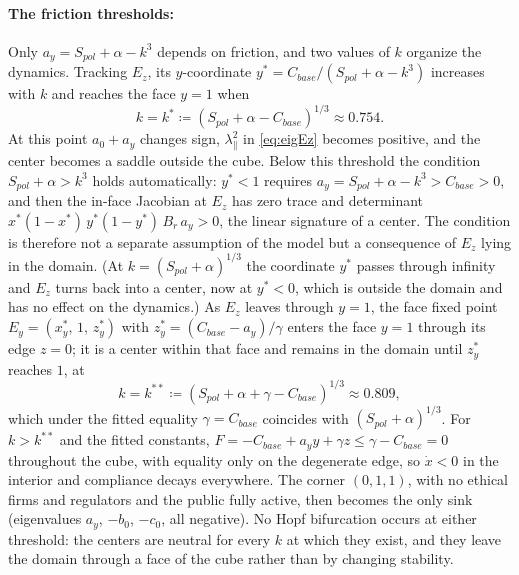 \documentclass[10pt]{article}
\begin{document}
\paragraph{The friction thresholds:} Only $a_y=S_{pol}+\alpha-k^3$ depends on friction, and two values of $k$ organize the dynamics. Tracking $E_z$, its $y$-coordinate $y^*=C_{base}/(S_{pol}+\alpha-k^3)$ increases with $k$ and reaches the face $y=1$ when
\begin{equation}
k = k^* \coloneqq (S_{pol}+\alpha-C_{base})^{1/3} \approx 0.754 .
\label{eq:kstar}
\end{equation}
At this point $a_0+a_y$ changes sign, $\lambda_\parallel^2$ in \cref{eq:eigEz} becomes positive, and the center becomes a saddle outside the cube. Below this threshold the condition $S_{pol}+\alpha>k^3$ holds automatically: $y^*<1$ requires $a_y=S_{pol}+\alpha-k^3>C_{base}>0$, and then the in-face Jacobian at $E_z$ has zero trace and determinant $x^*(1-x^*)\,y^*(1-y^*)\,B_r\,a_y>0$, the linear signature of a center. The condition is therefore not a separate assumption of the model but a consequence of $E_z$ lying in the domain. (At $k=(S_{pol}+\alpha)^{1/3}$ the coordinate $y^*$ passes through infinity and $E_z$ turns back into a center, now at $y^*<0$, which is outside the domain and has no effect on the dynamics.) As $E_z$ leaves through $y=1$, the face fixed point $E_y=(x_y^*,\,1,\,z_y^*)$ with $z_y^*=(C_{base}-a_y)/\gamma$ enters the face $y=1$ through its edge $z=0$; it is a center within that face and remains in the domain until $z_y^*$ reaches $1$, at
\begin{equation}
k = k^{**} \coloneqq (S_{pol}+\alpha+\gamma-C_{base})^{1/3} \approx 0.809 ,
\label{eq:k2star}
\end{equation}
which under the fitted equality $\gamma=C_{base}$ coincides with $(S_{pol}+\alpha)^{1/3}$. For $k>k^{**}$ and the fitted constants, $F=-C_{base}+a_y y+\gamma z\le \gamma-C_{base}=0$ throughout the cube, with equality only on the degenerate edge, so $\dot x<0$ in the interior and compliance decays everywhere. The corner $(0,1,1)$, with no ethical firms and regulators and the public fully active, then becomes the only sink (eigenvalues $a_y$, $-b_0$, $-c_0$, all negative). No Hopf bifurcation occurs at either threshold: the centers are neutral for every $k$ at which they exist, and they leave the domain through a face of the cube rather than by changing stability.
\end{document}
